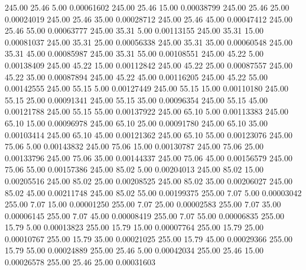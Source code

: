     245.00     25.46      5.00     0.00061602
    245.00     25.46     15.00     0.00038799
    245.00     25.46     25.00     0.00024019
    245.00     25.46     35.00     0.00028712
    245.00     25.46     45.00     0.00047412
    245.00     25.46     55.00     0.00063777
    245.00     35.31      5.00     0.00113155
    245.00     35.31     15.00     0.00081037
    245.00     35.31     25.00     0.00056338
    245.00     35.31     35.00     0.00060548
    245.00     35.31     45.00     0.00085987
    245.00     35.31     55.00     0.00108551
    245.00     45.22      5.00     0.00138409
    245.00     45.22     15.00     0.00112842
    245.00     45.22     25.00     0.00087557
    245.00     45.22     35.00     0.00087894
    245.00     45.22     45.00     0.00116205
    245.00     45.22     55.00     0.00142555
    245.00     55.15      5.00     0.00127449
    245.00     55.15     15.00     0.00110180
    245.00     55.15     25.00     0.00091341
    245.00     55.15     35.00     0.00096354
    245.00     55.15     45.00     0.00121788
    245.00     55.15     55.00     0.00137922
    245.00     65.10      5.00     0.00113383
    245.00     65.10     15.00     0.00096978
    245.00     65.10     25.00     0.00091780
    245.00     65.10     35.00     0.00103414
    245.00     65.10     45.00     0.00121362
    245.00     65.10     55.00     0.00123076
    245.00     75.06      5.00     0.00143832
    245.00     75.06     15.00     0.00130787
    245.00     75.06     25.00     0.00133796
    245.00     75.06     35.00     0.00144337
    245.00     75.06     45.00     0.00156579
    245.00     75.06     55.00     0.00157386
    245.00     85.02      5.00     0.00204013
    245.00     85.02     15.00     0.00205516
    245.00     85.02     25.00     0.00208525
    245.00     85.02     35.00     0.00206027
    245.00     85.02     45.00     0.00211748
    245.00     85.02     55.00     0.00199375
    255.00      7.07      5.00     0.00003042
    255.00      7.07     15.00     0.00001250
    255.00      7.07     25.00     0.00002583
    255.00      7.07     35.00     0.00006145
    255.00      7.07     45.00     0.00008419
    255.00      7.07     55.00     0.00006835
    255.00     15.79      5.00     0.00013823
    255.00     15.79     15.00     0.00007764
    255.00     15.79     25.00     0.00010767
    255.00     15.79     35.00     0.00021025
    255.00     15.79     45.00     0.00029366
    255.00     15.79     55.00     0.00024889
    255.00     25.46      5.00     0.00042034
    255.00     25.46     15.00     0.00026578
    255.00     25.46     25.00     0.00031603
